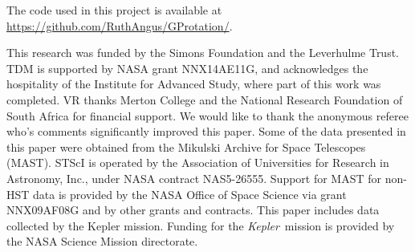 \documentclass[a4paper,fleqn,usenatbib,useAMS]{mnras}
\newcommand{\Kepler}{{\it Kepler}}
\begin{document}
The code used in this project is available at
\url{https://github.com/RuthAngus/GProtation/}.

This research was funded by the Simons Foundation and the Leverhulme Trust.
TDM is supported by NASA grant NNX14AE11G, and acknowledges the
hospitality of the Institute for Advanced Study,
where part of this work was completed.
VR thanks Merton College and the National Research Foundation of South Africa
for financial support.
We would like to thank the anonymous referee who's comments significantly
improved this paper.
Some of the data presented in this paper were obtained from the Mikulski
Archive for Space Telescopes (MAST).
STScI is operated by the Association of Universities for Research in
Astronomy, Inc., under NASA contract NAS5-26555.
Support for MAST for non-HST data is provided by the NASA Office of Space
Science via grant NNX09AF08G and by other grants and contracts.
This paper includes data collected by the Kepler mission. Funding for the
\Kepler\ mission is provided by the NASA Science Mission directorate.



\end{document}
